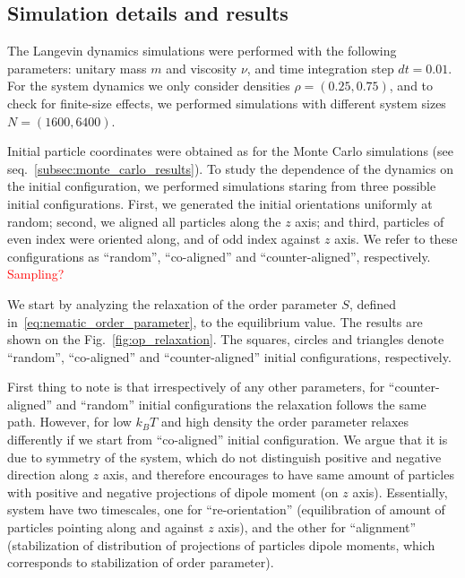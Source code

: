 \subsection{Simulation details and results}
\label{subsec:molecular_dynamics_results}

%


The Langevin dynamics simulations were performed with the following parameters: unitary mass $m$ and viscosity $\nu$, and time integration step $d t = 0.01$. For the system dynamics we only consider densities $\rho = (0.25, 0.75)$, and to check for finite-size effects, we performed simulations with different system sizes $N = (1600, 6400)$.

Initial particle coordinates were obtained as for the Monte Carlo simulations (see seq.~\ref{subsec:monte_carlo_results}). To study the dependence of the dynamics on the initial configuration, we performed simulations staring from three possible initial configurations. First, we generated the initial orientations uniformly at random; second,  we aligned all particles along the $z$ axis; and third, particles of even index were oriented along, and of odd index against $z$ axis. We refer to these configurations as ``random'', ``co-aligned'' and ``counter-aligned'', respectively. \textcolor{red}{Sampling?}

We start by analyzing the relaxation of the order parameter $S$, defined in~\eqref{eq:nematic_order_parameter}, to the equilibrium value. The results are shown on the Fig.~\ref{fig:op_relaxation}. The squares, circles and triangles denote ``random'', ``co-aligned'' and ``counter-aligned'' initial configurations, respectively.

First thing to note is that irrespectively of any other parameters, for ``counter-aligned'' and ``random'' initial configurations the relaxation follows the same path. However, for low $k_BT$ and high density the order parameter relaxes differently if we start from ``co-aligned'' initial configuration. We argue that it is due to symmetry of the system, which do not distinguish positive and negative direction along $z$ axis, and therefore encourages to have same amount of particles with positive and negative projections of dipole moment (on $z$ axis). Essentially, system have two timescales, one for ``re-orientation'' (equilibration of amount of particles pointing along and against $z$ axis), and the other for ``alignment'' (stabilization of distribution of projections of particles dipole moments, which corresponds to stabilization of order parameter).

